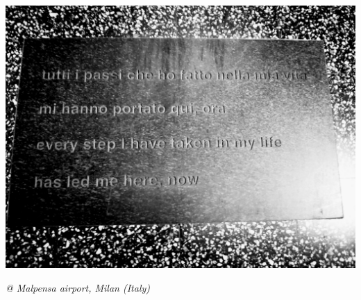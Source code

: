 \thispagestyle{empty}

\vspace{.33\textheight}
\begin{flushright}
\textit{}
\vspace{.33\textheight}%

\begin{minipage}{.6\textwidth}\footnotesize
\includegraphics[width=1.\textwidth]{smallstuff/mpxpic}

\begin{flushright}
\textit{@ Malpensa airport, Milan (Italy)}
\end{flushright}



\end{minipage}
\end{flushright}
